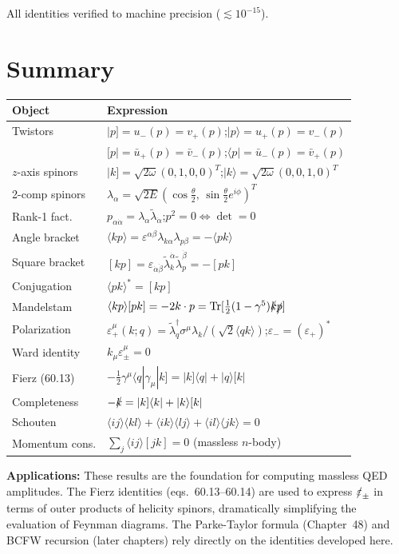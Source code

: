 All identities verified to machine precision ($\lesssim 10^{-15}$).

\section{Summary}

\begin{center}
\renewcommand{\arraystretch}{1.5}
\begin{tabular}{@{}ll@{}}
  \toprule
  Object & Expression \\
  \midrule
  Twistors & $|p]=u_-(p)=v_+(p)$;\quad $|p\rangle=u_+(p)=v_-(p)$ \\
  & $[p|=\bar u_+(p)=\bar v_-(p)$;\quad $\langle p|=\bar u_-(p)=\bar v_+(p)$ \\
  $z$-axis spinors & $|k]=\sqrt{2\omega}(0,1,0,0)^T$;\quad $|k\rangle=\sqrt{2\omega}(0,0,1,0)^T$ \\
  2-comp spinors & $\lambda_\alpha=\sqrt{2E}(\cos\tfrac\theta2,\,\sin\tfrac\theta2 e^{i\phi})^T$ \\
  Rank-1 fact. & $p_{\alpha\dot\alpha}=\lambda_\alpha\tilde\lambda_{\dot\alpha}$;\quad $p^2=0\Leftrightarrow\det=0$ \\
  Angle bracket & $\langle kp\rangle = \varepsilon^{\alpha\beta}\lambda_{k\alpha}\lambda_{p\beta} = -\langle pk\rangle$ \\
  Square bracket & $[kp] = \varepsilon_{\dot\alpha\dot\beta}\tilde\lambda_k^{\dot\alpha}\tilde\lambda_p^{\dot\beta} = -[pk]$ \\
  Conjugation & $\langle pk\rangle^* = [kp]$ \\
  Mandelstam & $\langle kp\rangle[pk] = -2k\cdot p = \mathrm{Tr}[\tfrac12(1-\gamma^5)\slashed{k}\slashed{p}]$ \\
  Polarization & $\varepsilon_+^\mu(k;q) = \tilde\lambda_q^\dagger\sigma^\mu\lambda_k/(\sqrt{2}\langle qk\rangle)$;\quad $\varepsilon_-=(\varepsilon_+)^*$ \\
  Ward identity & $k_\mu\varepsilon_\pm^\mu=0$ \\
  Fierz (60.13) & $-\tfrac12\gamma^\mu\langle q|\gamma_\mu|k]=|k]\langle q|+|q\rangle[k|$ \\
  Completeness & $-\slashed{k}=|k]\langle k|+|k\rangle[k|$ \\
  Schouten & $\langle ij\rangle\langle kl\rangle+\langle ik\rangle\langle lj\rangle+\langle il\rangle\langle jk\rangle=0$ \\
  Momentum cons. & $\sum_j\langle ij\rangle[jk]=0$ (massless $n$-body) \\
  \bottomrule
\end{tabular}
\end{center}

\bigskip
\noindent\textbf{Applications:} These results are the foundation for computing
massless QED amplitudes.  The Fierz identities (eqs.~60.13--60.14) are used
to express $\slashed\varepsilon_\pm$ in terms of outer products of helicity
spinors, dramatically simplifying the evaluation of Feynman diagrams.
The Parke-Taylor formula (Chapter~48) and BCFW recursion (later chapters)
rely directly on the identities developed here.

